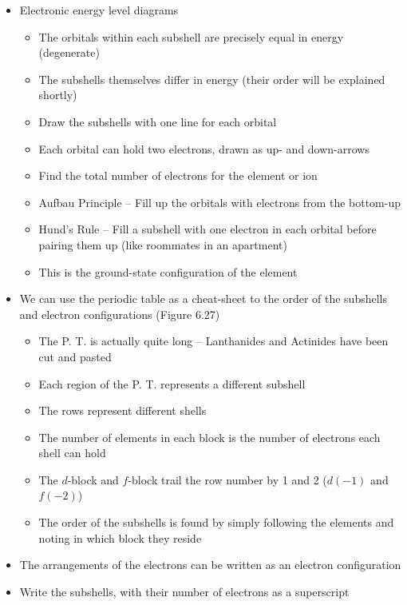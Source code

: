 \documentclass[12pt, openany, letterpaper]{memoir}
\begin{document}
\begin{itemize}
  \item Electronic energy level diagrams 
  \begin{itemize}
    \item The orbitals within each subshell are precisely equal in energy (degenerate)
    \item The subshells themselves differ in energy (their order will be explained shortly)
    \item Draw the subshells with one line for each orbital
    \item Each orbital can hold two electrons, drawn as up- and down-arrows
    \item Find the total number of electrons for the element or ion
    \item Aufbau Principle -- Fill up the orbitals with electrons from the bottom-up
    \item Hund's Rule -- Fill a subshell with one electron in each orbital before pairing them up (like roommates in an apartment)
    \item This is the ground-state configuration of the element
  \end{itemize}
  \item We can use the periodic table as a cheat-sheet to the order of the subshells and electron configurations (Figure 6.27)
	      \begin{itemize}
		      \item The P. T. is actually quite long -- Lanthanides and Actinides have been cut and pasted
		      \item Each region of the P. T. represents a different subshell
		      \item The rows represent different shells
		      \item The number of elements in each block is the number of electrons each shell can hold
		      \item The $d$-block and $f$-block trail the row number by 1 and 2 ($d(-1)$ and $f(-2)$)
		      \item The order of the subshells is found by simply following the elements and noting in which block they reside
	      \end{itemize}
	\item The arrangements of the electrons can be written as an electron configuration
	\item Write the subshells, with their number of electrons as a superscript


\end{itemize}
\end{document}
